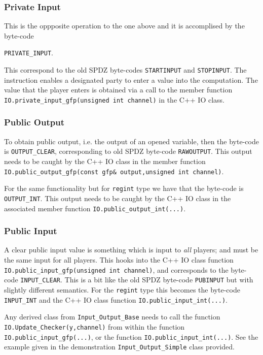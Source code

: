 \subsubsection{Private Input}
This is the oppposite operation to the one above and it
is accomplised by the byte-code
\begin{center}
    \verb+PRIVATE_INPUT+.
\end{center}
This correspond to the old SPDZ byte-codes
\verb+STARTINPUT+ and \verb+STOPINPUT+.
The instruction enables a designated party to enter a value into
the computation.
The value that the player enters is obtained via a call to the
member function
\verb+IO.private_input_gfp(unsigned int channel)+ in the C++ IO class.

\subsubsection{Public Output}
To obtain public output, i.e. the output of an opened variable,
then the byte-code is \verb+OUTPUT_CLEAR+, corresponding to
old SPDZ byte-code \verb+RAWOUTPUT+.
This output needs to be caught by the C++ IO class in
the member function \verb+IO.public_output_gfp(const gfp& output,unsigned int channel)+.

For the same functionality but for \verb|regint| type we have
that the byte-code is \verb+OUTPUT_INT+.
This output needs to be caught by the C++ IO class in
the associated member function
\verb+IO.public_output_int(...)+.

\subsubsection{Public Input}
A clear public input value is something which is input to
    {\em all} players; and must be the same input for all players.
This hooks into the C++ IO class function
\verb+IO.public_input_gfp(unsigned int channel)+, and corresponds to the byte-code
\verb+INPUT_CLEAR+.
This is a bit like the old SPDZ byte-code \verb+PUBINPUT+
but with slightly different semantics.
For the \verb|regint| type this becomes the byte-code \verb+INPUT_INT+
and the C++ IO class function
\verb+IO.public_input_int(...)+.

Any derived class from \verb+Input_Output_Base+ needs to call
the function \verb+IO.Update_Checker(y,channel)+ from within the
function \verb+IO.public_input_gfp(...)+,
or the function \verb+IO.public_input_int(...)+.
See the example given in the demonstration \verb+Input_Output_Simple+ class provided.

